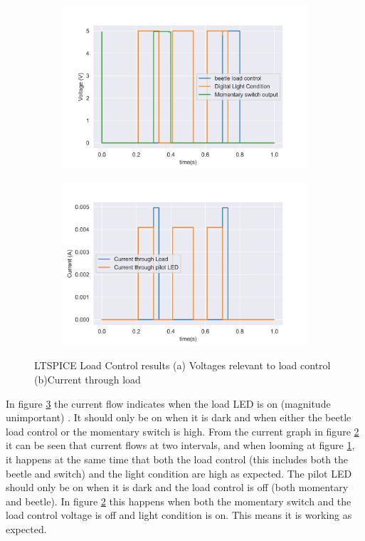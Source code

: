 \begin{figure}[!htb]
	\footnotesize
	\centering
	\begin{subfigure}[]{0.46\textwidth}
		\centering
		\includegraphics[width=1\linewidth]{./Figures/A7/A72loadcontsim.png}
		\caption{} \label{subfig:A7voltages}
	\end{subfigure}
	\begin{subfigure}[]{0.46\textwidth}
		\centering
		\includegraphics[width=1\linewidth]{./Figures/A7/A72loadcontsimcurr.png}
		\caption{ } \label{subfig:A7current}
	\end{subfigure}
	\caption[{LTSPICE Load Control results}]{LTSPICE Load Control results   (a)  Voltages relevant to load control (b)Current through load }
	\label{fig:loadcontA7}
\end{figure}

In figure \ref{fig:loadcontA7} the current flow indicates when the load LED is on (magnitude unimportant) . It should only be on when it is dark and when either the beetle load control or the momentary switch is high. From the current graph in figure \ref{subfig:A7current} it can be seen that current flows at two intervals, and when looming at figure \ref{subfig:A7voltages}, it happens at the same time that both the load control (this includes both the beetle and switch) and the light condition are high as expected.
The pilot LED should only be on when it is dark and the load control is off (both momentary and beetle). In figure \ref{subfig:A7current} this happens when both the momentary switch and the load control voltage is off and light condition is on. This means it is working as expected.


